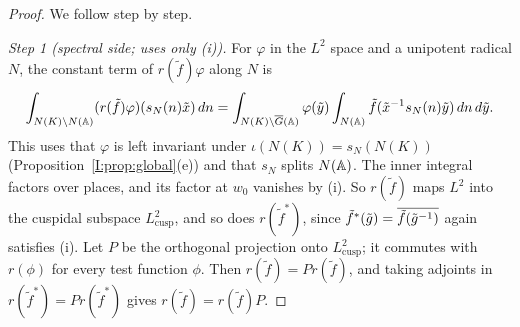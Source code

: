 \begin{proof}
We follow \cite[\S18]{FK86} step by step.

\emph{Step 1 (spectral side; uses only (i)).} For $\varphi$ in the $L^2$ space and a unipotent radical $N$, the constant term of $r(\tilde f)\varphi$ along $N$ is
\[ \int_{N(K)\backslash N(\mathbb{A})}(r(\tilde f)\varphi)(s_N(n)\tilde x)\,dn=\int_{N(K)\backslash\overline{G}(\mathbb{A})}\varphi(\tilde y)\int_{N(\mathbb{A})}\tilde f(\tilde x^{-1}s_N(n)\tilde y)\,dn\,d\tilde y. \]
This uses that $\varphi$ is left invariant under $\iota(N(K))=s_N(N(K))$ (Proposition~\ref{I:prop:global}(e)) and that $s_N$ splits $N(\mathbb{A})$. The inner integral factors over places, and its factor at $w_0$ vanishes by (i). So $r(\tilde f)$ maps $L^2$ into the cuspidal subspace $L^2_{\mathrm{cusp}}$, and so does $r(\tilde f^*)$, since $\tilde f^*(\tilde g)=\overline{\tilde f(\tilde g^{-1})}$ again satisfies (i). Let $P$ be the orthogonal projection onto $L^2_{\mathrm{cusp}}$; it commutes with $r(\phi)$ for every test function $\phi$. Then $r(\tilde f)=Pr(\tilde f)$, and taking adjoints in $r(\tilde f^*)=Pr(\tilde f^*)$ gives $r(\tilde f)=r(\tilde f)P$.


\end{proof}
